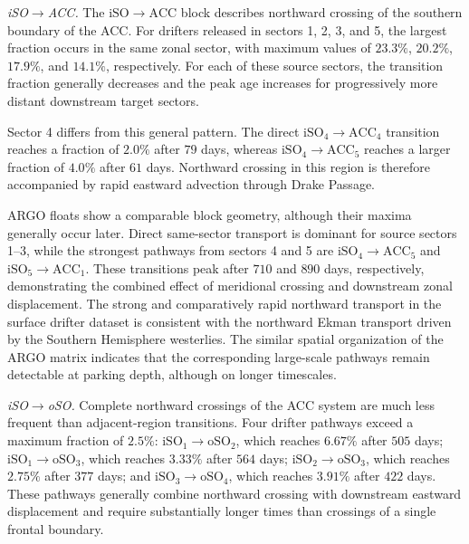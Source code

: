 \documentclass[
  draft
]{agujournal2025}
\begin{document}
                \medskip
                \noindent
                \textit{iSO$\boldsymbol{\rightarrow}$ACC.}
                The $\mathrm{iSO} \rightarrow \mathrm{ACC}$ block describes northward crossing of the southern boundary of the ACC. For drifters released in sectors 1, 2, 3, and 5, the largest fraction occurs in the same zonal sector, with maximum values of $23.3 \%$, $20.2 \%$, $17.9 \%$, and $14.1 \%$, respectively. For each of these source sectors, the transition fraction generally decreases and the peak age increases for progressively more distant downstream target sectors.
    
                Sector 4 differs from this general pattern. The direct $\mathrm{iSO}_4 \rightarrow \mathrm{ACC}_4$ transition reaches a fraction of $2.0 \%$ after $79$ days, whereas $\mathrm{iSO}_4 \rightarrow \mathrm{ACC}_5$ reaches a larger fraction of $4.0 \%$ after $61$ days. Northward crossing in this region is therefore accompanied by rapid eastward advection through Drake Passage.
    
                ARGO floats show a comparable block geometry, although their maxima generally occur later. Direct same-sector transport is dominant for source sectors 1--3, while the strongest pathways from sectors 4 and 5 are $\mathrm{iSO}_4 \rightarrow \mathrm{ACC}_5$ and            $\mathrm{iSO}_5 \rightarrow \mathrm{ACC}_1$. These transitions peak after $710$ and $890$ days, respectively, demonstrating the combined effect of meridional crossing and downstream zonal displacement. The strong and comparatively rapid northward transport in the surface drifter dataset is consistent with the northward Ekman transport driven by the Southern Hemisphere westerlies. The similar spatial organization of the ARGO matrix indicates that the corresponding large-scale pathways remain detectable at parking depth, although on longer timescales.
    
                \medskip
                \noindent
                \textit{iSO$\boldsymbol{\rightarrow}$oSO.}
                Complete northward crossings of the ACC system are much less frequent than adjacent-region transitions. Four drifter pathways exceed a maximum fraction of $2.5 \%$: $\mathrm{iSO}_1 \rightarrow \mathrm{oSO}_2$, which reaches $6.67 \%$ after $505$ days; $\mathrm{iSO}_1 \rightarrow \mathrm{oSO}_3$, which reaches $3.33 \%$ after $564$ days; $\mathrm{iSO}_2 \rightarrow \mathrm{oSO}_3$, which reaches $2.75 \%$ after $377$ days; and $\mathrm{iSO}_3 \rightarrow \mathrm{oSO}_4$, which reaches $3.91 \%$ after $422$ days. These pathways generally combine northward crossing with downstream eastward displacement and require substantially longer times than crossings of a single frontal boundary.
    
\end{document}

